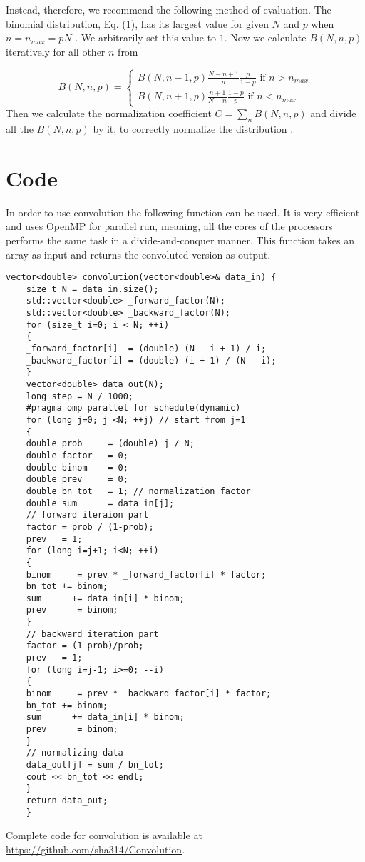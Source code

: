 	Instead, therefore, we recommend the following method of evaluation. The binomial distribution, Eq. (1), has its largest value for given $N$ and $p$ when $n = n_{max} = p N$ . We arbitrarily set this value to $1$. Now we calculate $B(N, n, p)$ iteratively for all other $n$ from
	
	\begin{equation*}
	B(N,n,p) = 
	\begin{cases}
		B(N, n-1, p) \frac{N-n+1}{n} \frac{p}{1-p}  \text{ if } n > n_{max}\\
		B(N, n+1, p) \frac{n+1}{N-n} \frac{1-p}{p}  \text{ if } n < n_{max}
	\end{cases}   
	\end{equation*}
	Then we calculate the normalization coefficient $C = \sum_{n} B(N, n, p)$ and divide all the $B(N, n, p)$ by it, to correctly normalize the distribution 	\cite{Newman2000, Newman2001}.
	
\section{Code}
	In order to use convolution the following function can be used. It is very efficient and uses OpenMP for parallel run, meaning, all the cores of the processors performs the same task in a divide-and-conquer manner. This function takes an array as input and returns the convoluted version as output.
	\begin{lstlisting}[style=CStyle]
	vector<double> convolution(vector<double>& data_in) {
	size_t N = data_in.size();
	std::vector<double> _forward_factor(N);
	std::vector<double> _backward_factor(N);
	for (size_t i=0; i < N; ++i)
	{
	_forward_factor[i]  = (double) (N - i + 1) / i;
	_backward_factor[i] = (double) (i + 1) / (N - i);
	}
	vector<double> data_out(N);
	long step = N / 1000;
	#pragma omp parallel for schedule(dynamic)
	for (long j=0; j <N; ++j) // start from j=1
	{
	double prob     = (double) j / N;
	double factor   = 0;
	double binom    = 0;
	double prev     = 0;
	double bn_tot   = 1; // normalization factor
	double sum      = data_in[j];
	// forward iteraion part
	factor = prob / (1-prob);
	prev   = 1;
	for (long i=j+1; i<N; ++i)
	{
	binom     = prev * _forward_factor[i] * factor;
	bn_tot += binom;
	sum      += data_in[i] * binom;
	prev      = binom;
	}
	// backward iteration part
	factor = (1-prob)/prob;
	prev   = 1;
	for (long i=j-1; i>=0; --i)
	{
	binom     = prev * _backward_factor[i] * factor;
	bn_tot += binom;
	sum      += data_in[i] * binom;
	prev      = binom;
	}
	// normalizing data
	data_out[j] = sum / bn_tot;
	cout << bn_tot << endl;
	}
	return data_out;
	}
	\end{lstlisting}
Complete code for convolution is available at 
\url{https://github.com/sha314/Convolution}.\\

